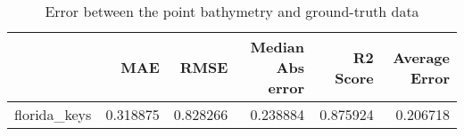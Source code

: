 \begin{table}[h!]
\centering
\caption{Error between the point bathymetry and ground-truth data}
\label{tab:florida_keys_lidar_error}
\begin{tabular}{lrrrrr}
\toprule
 & MAE & RMSE & Median Abs error & R2 Score & Average Error \\
\midrule
florida_keys & 0.318875 & 0.828266 & 0.238884 & 0.875924 & 0.206718 \\
\bottomrule
\end{tabular}
\end{table}

